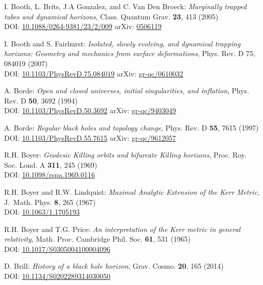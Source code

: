 \begin{thebibliography}{123}
I. Booth, L. Brits, J.A Gonzalez, and C. Van Den Broeck:
{\em Marginally trapped tubes and dynamical horizons},
Class. Quantum Grav. {\bf 23}, 413 (2005)\\
DOI: \href{https://doi.org/10.1088/0264-9381/23/2/009}{10.1088/0264-9381/23/2/009}\hfill
arXiv: \href{https://arxiv.org/abs/gr-qc/0506119}{0506119}

I. Booth and S. Fairhurst:
{\em Isolated, slowly evolving, and dynamical trapping horizons: Geometry and mechanics from surface deformations},
Phys. Rev. D 75, 084019 (2007)\\
DOI: \href{https://doi.org/10.1103/PhysRevD.75.084019}{10.1103/PhysRevD.75.084019}\hfill
arXiv: \href{https://arxiv.org/abs/gr-qc/0610032}{gr-qc/0610032}

A. Borde:
{\em Open and closed universes, initial singularities, and inflation},
Phys. Rev. D {\bf 50}, 3692 (1994)\\
DOI: \href{https://doi.org/10.1103/PhysRevD.50.3692}{10.1103/PhysRevD.50.3692}\hfill
arXiv: \href{https://arxiv.org/abs/gr-qc/9403049}{gr-qc/9403049}

A. Borde:
{\em Regular black holes and topology change},
Phys. Rev. D {\bf 55}, 7615 (1997)\\
DOI: \href{https://doi.org/10.1103/PhysRevD.55.7615}{10.1103/PhysRevD.55.7615}\hfill
arXiv: \href{https://arxiv.org/abs/gr-qc/9612057}{gr-qc/9612057}

R.H. Boyer: {\em Geodesic Killing orbits and bifurcate Killing horizons},
Proc. Roy. Soc. Lond. A {\bf 311}, 245 (1969)\\
DOI: \href{https://doi.org/10.1098/rspa.1969.0116}{10.1098/rspa.1969.0116}

R.H. Boyer and R.W. Lindquist: {\em Maximal Analytic Extension of the Kerr Metric},
J.~Math. Phys. {\bf 8}, 265 (1967)\\
DOI: \href{https://doi.org/10.1063/1.1705193}{10.1063/1.1705193}

R.H. Boyer and T.G. Price: {\em An interpretation of the Kerr metric in general relativity},
Math. Proc. Cambridge Phil. Soc. {\bf 61}, 531 (1965)\\
DOI: \href{https://doi.org/10.1017/S0305004100004096}{10.1017/S0305004100004096}

D. Brill: {\em History of a black hole horizon},
Grav. Cosmo. {\bf 20}, 165 (2014) \\
DOI: \href{https://doi.org/10.1134/S0202289314030050}{10.1134/S0202289314030050}


\end{thebibliography}
